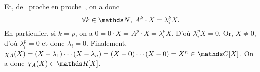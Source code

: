 \begin{exo}
\begin{itemize}
		Et, de \guillemotleft~proche en proche~\guillemotright, on a donc \[
			\forall k \in \N,\:A^k\cdot X = \lambda_i^k X
		.\]
		En particulier, si $k=p$, on a $0 = 0\cdot X = A^p\cdot X = \lambda_i^pX$. D'où $\lambda_i^p X = 0$. Or, $X \neq 0$, d'où $\lambda_i^p = 0$\/ et donc $\lambda_i = 0$.
		Finalement, $\chi_A(X) = (X-\lambda_1) \cdots (X-\lambda_n) = (X-0)\cdots(X-0) = X^n  \in \C[X]$. On a donc $\chi_A(X) \in \R[X]$.
	\end{itemize}
\end{exo}
